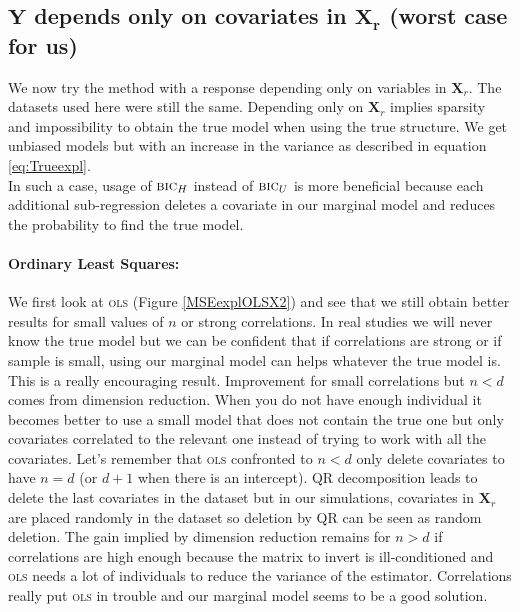 \documentclass[12pt,a4paper]{report}
\begin{document}
\clearpage
	
	\subsection{$\boldsymbol{Y}$ depends only on covariates in $\boldsymbol{X_r}$ (worst case for us)}	 \label{tableMSEsimgauche}
We now try the method with a response depending only on variables in $\boldsymbol{X}_{r}$. The datasets used here were still the same.
Depending only on $\boldsymbol{X}_r$ implies sparsity and impossibility to obtain the true model when using the true structure.  We get unbiased models but with an increase in the variance as described in equation \ref{eq:Trueexpl}. \\
	In such a case, usage of $\mbox{{\sc bic}}_H$ instead of $\mbox{{\sc bic}}_U$ is more beneficial because each additional sub-regression deletes a covariate in our marginal model and reduces the probability to find the true model. \\
	
	\paragraph{Ordinary Least Squares:}We first look at \textsc{ols} (Figure \ref{MSEexplOLSX2}) and see that we still obtain better results for small values of $n$ or strong correlations. In real studies we will never know the true model but we can be confident that if correlations are strong or if sample is small, using our marginal model can helps whatever the true model is. This is a really encouraging result. Improvement for small correlations but $n<d$ comes from dimension reduction. When you do not have enough individual it becomes better to use a small model that does not contain the true one but only covariates correlated to the relevant one instead of trying to work with all the covariates. Let's remember that \textsc{ols} confronted to $n<d$ only delete covariates to have $n=d$ (or $d+1$ when there is an intercept). QR decomposition leads to delete the last  covariates in the dataset but in our simulations, covariates in $\boldsymbol{X}_r$ are placed randomly in the dataset so deletion by QR can be seen as random deletion. The gain implied by dimension reduction remains for $n>d$ if correlations are high enough because the matrix to invert is ill-conditioned and \textsc{ols} needs a lot of individuals to reduce the variance of the estimator. Correlations really put \textsc{ols} in trouble and our marginal model seems to be a good solution. \\
	
\end{document}

